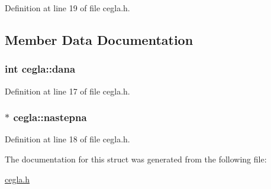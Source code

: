 Definition at line 19 of file cegla.\-h.



\subsection{Member Data Documentation}
\hypertarget{structcegla_a25ba885f5ac99791f80fd1676ce22a3a}{
\subsubsection[{dana}]{\setlength{\rightskip}{0pt plus 5cm}int cegla\-::dana}}\label{structcegla_a25ba885f5ac99791f80fd1676ce22a3a}


Definition at line 17 of file cegla.\-h.

\hypertarget{structcegla_aca5144299572d01d919e2655e447f9a8}{
\subsubsection[{nastepna}]{$\ast$ cegla\-::nastepna}}\label{structcegla_aca5144299572d01d919e2655e447f9a8}


Definition at line 18 of file cegla.\-h.



The documentation for this struct was generated from the following file\-:\begin{DoxyCompactItemize}
\item 
\hyperlink{cegla_8h}{cegla.\-h}\end{DoxyCompactItemize}
